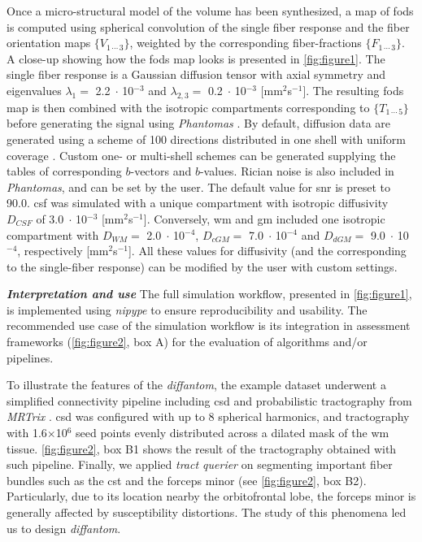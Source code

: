 \documentclass[english]{frontiers/frontiersSCNS} %
\newcommand{\e}[1]{\ensuremath{\;\cdot\,}10\ensuremath{^{#1}}}
\begin{document}
Once a micro-structural model of the volume has been synthesized, a map of \glspl{fod} is computed using spherical
  convolution of the single fiber response and the fiber orientation maps $\{V_{1\,\cdots\,3}\}$, weighted by the
  corresponding fiber-fractions $\{F_{1\,\cdots\,3}\}$.
A close-up showing how the \glspl{fod} map looks is presented in \autoref{fig:figure1}.
The single fiber response is a Gaussian diffusion tensor with axial symmetry and eigenvalues $\lambda_1=$ 2.2\e{-3}
  and $\lambda_{2,3}=$ 0.2\e{-3} [mm$^2$s$^{-1}$].
The resulting \glspl{fod} map is then combined with the isotropic compartments corresponding to $\{T_{1\,\cdots\,5}\}$
  before generating the signal using \emph{Phantomas} \citep{caruyer_Phantomas_2014}.
By default, diffusion data are generated using a scheme of 100 directions distributed in one shell with uniform
  coverage \citep{caruyer_design_2013}.
Custom one- or multi-shell schemes can be generated supplying the tables of corresponding $b$-vectors and $b$-values.
Rician noise is also included in \emph{Phantomas}, and can be set by the user.
The default value for \gls*{snr} is preset to 90.0.
\Gls*{csf} was simulated with a unique compartment with isotropic diffusivity $D_{CSF}$ of 3.0\e{-3} [mm$^2$s$^{-1}$].
Conversely, \Gls*{wm} and \gls*{gm} included one isotropic compartment with $D_{WM} =$ 2.0\e{-4}, $D_{cGM} =$ 7.0\e{-4}
  and $D_{dGM} =$ 9.0\e{-4}, respectively [mm$^2$s$^{-1}$].
All these values for diffusivity (and the corresponding to the single-fiber response) can be modified by the user with
  custom settings.


\noindent\textbf{\textit{Interpretation and use\textcolon}}
The full simulation workflow, presented in \autoref{fig:figure1}, is implemented using
  \emph{nipype} \citep{gorgolewski_nipype_2011} to ensure reproducibility and usability.
The recommended use case of the simulation workflow is its integration in assessment frameworks
  (\autoref{fig:figure2}, box A) for the evaluation of algorithms and/or pipelines.


To illustrate the features of the \emph{diffantom}, the example dataset underwent a simplified
  connectivity pipeline including \gls*{csd} and probabilistic tractography from
  \emph{MRTrix} \citep{tournier_mrtrix_2012}.
\Gls*{csd} was configured with up to 8 spherical harmonics, and tractography with 1.6$\times$10$^\text{6}$
  seed points evenly distributed across a dilated mask of the \gls*{wm} tissue.
\autoref{fig:figure2}, box B1 shows the result of the tractography obtained with such pipeline.
Finally, we applied \emph{tract querier} \citep{wassermann_on_2013} on segmenting important fiber bundles such
  as the \gls*{cst} and the forceps minor (see \autoref{fig:figure2}, box B2).
Particularly, due to its location nearby the orbitofrontal lobe, the forceps minor is generally affected by
  susceptibility distortions.
The study of this phenomena \citep{esteban_simulationbased_2014} led us to design \emph{diffantom}.
\end{document}
